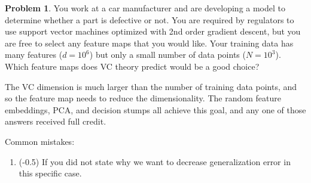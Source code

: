 \documentclass[10pt]{exam}
\theoremstyle{definition}
\newtheorem{problem}{Problem}
\begin{document}
\newpage
\begin{problem}
    You work at a car manufacturer and are developing a model to determine whether a part is defective or not.
    You are required by regulators to use support vector machines optimized with 2nd order gradient descent,
    but you are free to select any feature maps that you would like.
    Your training data has many features ($d=10^6$) but only a small number of data points ($N=10^3$).
    Which feature maps does VC theory predict would be a good choice?
\end{problem}
\begin{solution}
    The VC dimension is much larger than the number of training data points, and so the feature map needs to reduce the dimensionality.
    The random feature embeddings, PCA, and decision stumps all achieve this goal, and any one of those answers received full credit.

    Common mistakes:
    \begin{enumerate}
        \item (-0.5) If you did not state why we want to decrease generalization error in this specific case.
    \end{enumerate}
\end{solution}
\end{document}
